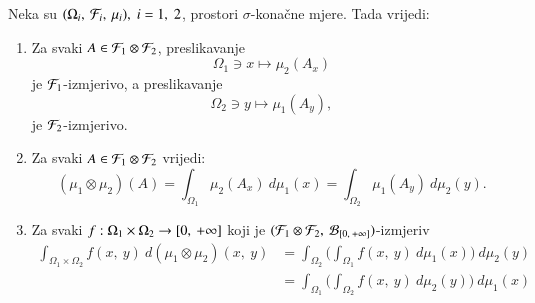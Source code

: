 \begin{zad} \label{zad:4.15}
    Neka su $(\Omega_i, \: \mathcal{F}_i, \: \mu_i), \; i = 1, \; 2$, prostori $\sigma$-kona\v cne mjere.
    Tada vrijedi:
    \begin{enumerate}[label=(\roman*)]
        \item   \label{zad:4.15.1}
        Za svaki $A \in \mathcal{F}_1 \otimes \mathcal{F}_2$, preslikavanje
        \begin{equation*}
            \Omega_1 \ni x \mapsto \mu_2 (A_x)
        \end{equation*}
        je $\mathcal{F}_1$-izmjerivo, a preslikavanje
        \begin{equation*}
            \Omega_2 \ni y \mapsto \mu_1 (A_y),
        \end{equation*}
        je $\mathcal{F}_2$-izmjerivo.
        \item   \label{zad:4.15.2}
        Za svaki $A \in \mathcal{F}_1 \otimes \mathcal{F}_2$ vrijedi:
        \begin{equation*}
            (\mu_1 \otimes \mu_2) (A) = \int_{\Omega_1} \mu_2 (A_x) \: d \mu_1(x) = \int_{\Omega_2} \mu_1 (A_y) \: d \mu_2 (y).
        \end{equation*}
        \item   \label{zad:4.15.3}
        Za svaki $f: \Omega_1 \times \Omega_2 \to [{0}, \:{+\infty}]$ koji je $({\mathcal{F}_1 \otimes \mathcal{F}_2}, \: {\mathcal{B}_{[{0}, \:{+\infty}]}})$-izmjeriv
        \begin{align*}
            \int_{\Omega_1 \times \Omega_2} f(x, \: y) \: d (\mu_1 \otimes \mu_2)(x, \:y) &= \int_{\Omega_2} \Big( \int_{\Omega_1} f(x, \: y) \: d \mu_1 (x) \Big) \: d \mu_2 (y)\\
            &= \int_{\Omega_1} \Big( \int_{\Omega_2} f(x, \: y) \: d \mu_2 (y) \Big) \: d \mu_1 (x)
        \end{align*}
    \end{enumerate} 
\end{zad}

